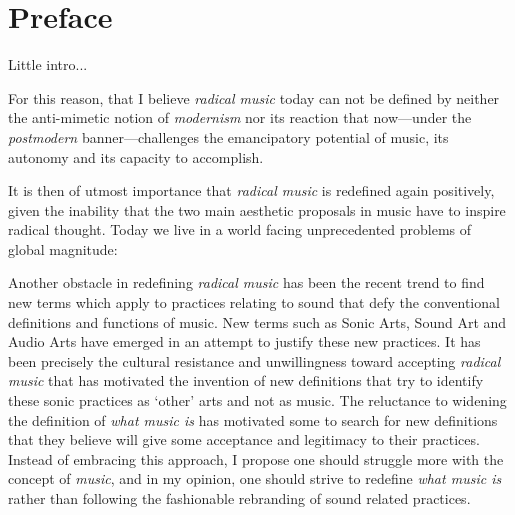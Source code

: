 \chapter{Preface}


Little intro...

For this reason, that I believe \emph{radical music} today can not be defined by neither the anti-mimetic notion of \emph{modernism} nor its reaction that now---under the \emph{postmodern} banner---challenges the emancipatory potential of music, its autonomy and its capacity to accomplish. 

It is then of utmost importance that \emph{radical music} is redefined again positively, given the inability that the two main aesthetic proposals in music have to inspire radical thought. Today we live in a world facing unprecedented problems of global magnitude:


Another obstacle in redefining \emph{radical music} has been the recent trend to find new terms which apply to practices relating to sound that defy the conventional definitions and functions of music. New terms such as Sonic Arts, Sound Art and Audio Arts have emerged in an attempt to justify these new practices. It has been precisely the cultural resistance and unwillingness toward accepting \emph{radical music} that has motivated the invention of new definitions that try to identify these sonic practices as `other' arts and not as music. The reluctance to widening the definition of \emph{what music is} has motivated some to search for new definitions that they believe will give some acceptance and legitimacy to their practices. Instead of embracing this approach, I propose one should struggle more with the concept of \emph{music}, and in my opinion, one should strive to redefine \emph{what music is} rather than following the fashionable rebranding of sound related practices. 

